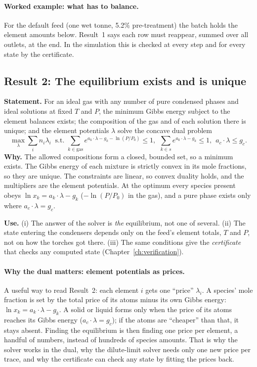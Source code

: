 \documentclass[11pt,a4paper]{article}
\begin{document}
\paragraph{Worked example: what has to balance.} For the default feed (one wet tonne, 5.2\% pre-treatment) the batch holds the element amounts below. Result~1 says each row must reappear, summed over all outlets, at the end. In the simulation this is checked at every step and for every state by the certificate.


\subsection{Result 2: The equilibrium exists and is unique}
\textbf{Statement.} For an ideal gas with any number of pure condensed phases and ideal solutions at fixed $T$ and $P$, the minimum Gibbs energy subject to the element balances exists; the composition of the gas and of each solution there is unique; and the element potentials $\lambda$ solve the concave dual problem
\[
\max_{\lambda} \sum_i n_i\lambda_i \ \text{ s.t. } \sum_{k\in\text{gas}} e^{a_k\cdot\lambda - g_k - \ln(P/P_0)}\le 1,\ \ \sum_{k\in s} e^{a_k\cdot\lambda - g_k}\le 1,\ \ a_c\cdot\lambda\le g_c .
\]
\textbf{Why.} The allowed compositions form a closed, bounded set, so a minimum exists. The Gibbs energy of each mixture is strictly convex in its mole fractions, so they are unique. The constraints are linear, so convex duality holds, and the multipliers are the element potentials. At the optimum every species present obeys $\ln x_k = a_k\cdot\lambda - g_k$ ($-\ln(P/P_0)$ in the gas), and a pure phase exists only where $a_c\cdot\lambda = g_c$.

\textbf{Use.} (i) The answer of the solver is \emph{the} equilibrium, not one of several. (ii) The state entering the condensers depends only on the feed's element totals, $T$ and $P$, not on how the torches got there. (iii) The same conditions give the \emph{certificate} that checks any computed state (Chapter~\ref{ch:verification}).

\paragraph{Why the dual matters: element potentials as prices.} A useful way to read Result~2: each element $i$ gets one ``price'' $\lambda_i$. A species' mole fraction is set by the total price of its atoms minus its own Gibbs energy: $\ln x_k = a_k\cdot\lambda - g_k$. A solid or liquid forms only when the price of its atoms reaches its Gibbs energy ($a_c\cdot\lambda = g_c$); if the atoms are ``cheaper'' than that, it stays absent. Finding the equilibrium is then finding one price per element, a handful of numbers, instead of hundreds of species amounts. That is why the solver works in the dual, why the dilute-limit solver needs only one new price per trace, and why the certificate can check any state by fitting the prices back.
\end{document}
